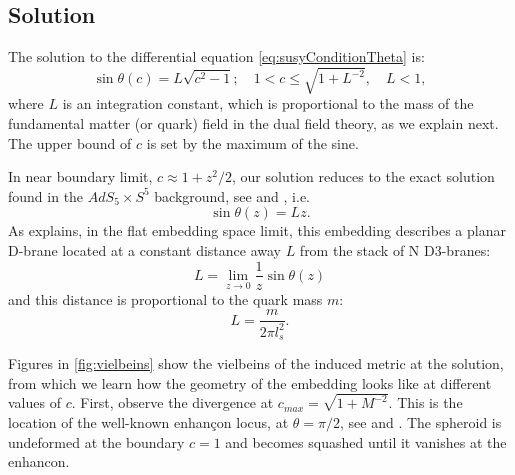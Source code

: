 \subsection{Solution}

The solution to the differential equation \eqref{eq:susyConditionTheta} is:
\begin{equation}\label{eq:susyConditionSolution}
\boxed{\sin\theta(c) = L \sqrt{c^2-1}; \quad 1 < c \leq \sqrt{1+L^{-2}}, \quad L < 1},
\end{equation}
where $L$ is an integration constant, which is proportional to the mass of the fundamental matter (or quark) field in the dual field theory, as we explain next. The upper bound of $c$ is set by the maximum of the sine.

In near boundary limit, $c \approx 1 + z^2/2$, our solution reduces to the exact solution found in the $AdS_5 \times S^5$ background, see \cite{Karch:2002sh} and \cite{Karch:2005ms}, i.e.
\begin{equation}
 \sin\theta(z) = L z.
\end{equation}
As \cite{Karch:2005ms} explains, in the flat embedding space limit, this embedding describes a planar D-brane located at a constant distance away $L$ from the stack of N D3-branes:
\begin{equation}
 L = \lim_{z \rightarrow 0 } \frac{1}{z} \sin\theta(z)
\end{equation}
and this distance is proportional to the quark mass $m$:
\begin{equation}
 L = \dfrac{m}{2 \pi l_s^2}.
\end{equation}


Figures in \ref{fig:vielbeins} show the vielbeins of the induced metric at the solution, from which we learn how the geometry of the embedding looks like at different values of $c$. First, observe the divergence at $c_{max}=\sqrt{1+M^{-2}}$. This is the location of the well-known enhançon locus, at $\theta = \pi/2$, see \cite{Buchel:2000cn} and \cite{Evans:2000ct}. The spheroid is undeformed at the boundary $c=1$ and becomes squashed until it vanishes at the enhancon. 

